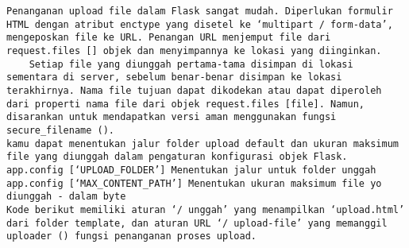 \documentclass[12pt,a4paper]{article}
\begin{document}
\begin{verbatim}
Penanganan upload file dalam Flask sangat mudah. Diperlukan formulir HTML dengan atribut enctype yang disetel ke ‘multipart / form-data’, mengeposkan file ke URL. Penangan URL menjemput file dari request.files [] objek dan menyimpannya ke lokasi yang diinginkan.
	Setiap file yang diunggah pertama-tama disimpan di lokasi sementara di server, sebelum benar-benar disimpan ke lokasi terakhirnya. Nama file tujuan dapat dikodekan atau dapat diperoleh dari properti nama file dari objek request.files [file]. Namun, disarankan untuk mendapatkan versi aman menggunakan fungsi secure_filename ().
kamu dapat menentukan jalur folder upload default dan ukuran maksimum file yang diunggah dalam pengaturan konfigurasi objek Flask.
app.config [‘UPLOAD_FOLDER’] Menentukan jalur untuk folder unggah
app.config [‘MAX_CONTENT_PATH’] Menentukan ukuran maksimum file yo diunggah - dalam byte
Kode berikut memiliki aturan ‘/ unggah’ yang menampilkan ‘upload.html’ dari folder template, dan aturan URL ‘/ upload-file’ yang memanggil uploader () fungsi penanganan proses upload.


\end{verbatim}
\end{document}

